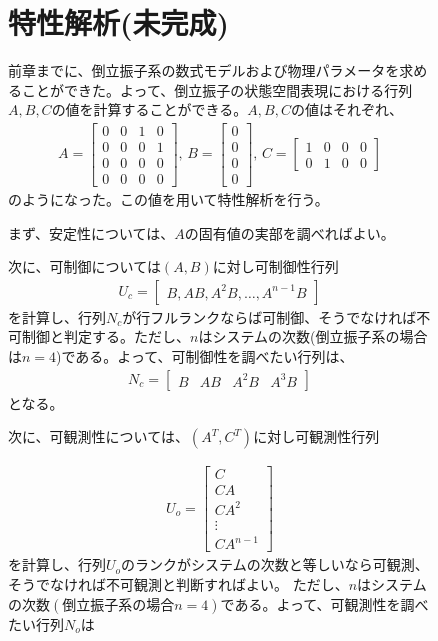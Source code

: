 \documentclass[a4j,11pt,twoside]{ujbook}
\begin{document}
\begin{figure}[htbp]
\begin{center}
	\section{特性解析(未完成)}
		前章までに、倒立振子系の数式モデルおよび物理パラメータを求めることができた。よって、倒立振子の状態空間表現における行列$A,B,C$の値を計算することができる。$A,B,C$の値はそれぞれ、
		\begin{eqnarray*}
			A = \left[
			\begin{array}{rrrr}
				0 & 0 & 1 & 0\\
				0 & 0 & 0 & 1\\
				0 & 0 & 0 & 0\\
				0 & 0 & 0 & 0
			\end{array}
			\right],\,
			B = \left[
			\begin{array}{c}
				0 \\
				0 \\
				0 \\
				0
			\end{array}
			\right],\,
			C = \left[
			\begin{array}{cccc}
				1 &  0 & 0 & 0\\
				0 &  1 & 0 & 0
			\end{array}
			\right]
		\end{eqnarray*}
		のようになった。この値を用いて特性解析を行う。
		
		まず、安定性については、$A$の固有値の実部を調べればよい。
		
		次に、可制御については$(A,B)$に対し可制御性行列
		\begin{eqnarray*}
			U_c=
			\left[
				\begin{array}{ccc}
					B , AB , A^2B , … , A^{n-1}B
				\end{array}
			\right]
		\end{eqnarray*}
		を計算し、行列$N_c$が行フルランクならば可制御、そうでなければ不可制御と判定する。ただし、$n$はシステムの次数(倒立振子系の場合は$n=4$)である。よって、可制御性を調べたい行列は、
		\begin{eqnarray*}
			N_c 
			=
			\left[
				\begin{array}{cccc}
					B & AB & A^2B & A^3B
				\end{array}
			\right]
		\end{eqnarray*}
		となる。
		
		次に、可観測性については、$(A^T,C^T)$に対し可観測性行列
		
		\begin{eqnarray*}
			U_o = \left[
			\begin{array}{c}
				C\\
				CA\\
				CA^2\\
				\vdots\\
				CA^{n-1}
			\end{array}
			\right]
		\end{eqnarray*}
		を計算し、行列$U_o$のランクがシステムの次数と等しいなら可観測、そうでなければ不可観測と判断すればよい。	ただし、$n$はシステムの次数$(倒立振子系の場合n=4)$である。よって、可観測性を調べたい行列$N_o$は
		

\end{center}
\end{figure}
\end{document}
